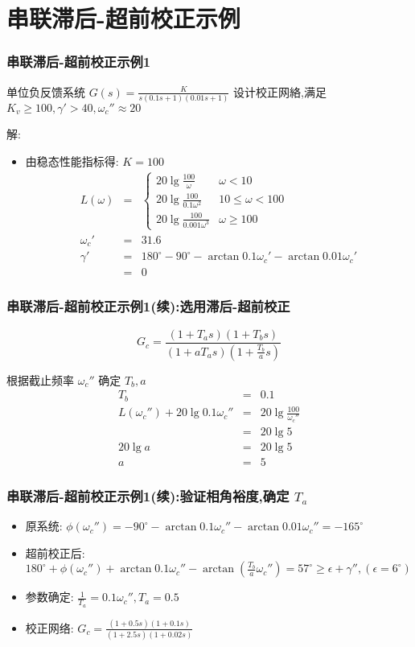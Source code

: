 \documentclass[table]{beamer}
\begin{document}
\section{串联滞后-超前校正示例}
\label{sec-2}
\begin{frame}
\frametitle{串联滞后-超前校正示例1}
\label{sec-2-1}

单位负反馈系统  $G(s)=\frac{K}{s(0.1s+1)(0.01s+1)}$  设计校正网絡,满足  $K_v \geq 100,\gamma'>40,\omega_c''\approx 20$ 

解:
\begin{itemize}
\item <2->由稳态性能指标得:  $K=100$ 
      \begin{eqnarray*}
      L(\omega) & = &\begin{cases}20\lg\frac{100}{\omega} & \omega<10 \\
                                  20\lg\frac{100}{0.1\omega^2} & 10\leq \omega<100 \\
                                  20\lg\frac{100}{0.001\omega^3} & \omega \geq 100 \end{cases} \\
      \omega_c' &=& 31.6 \\
      \gamma' &=& 180^{\circ}-90^{\circ}-\arctan0.1\omega_c'-\arctan0.01\omega_c' \\
       &=& 0 
      \end{eqnarray*}
\end{itemize}
\end{frame}
\begin{frame}
\frametitle{串联滞后-超前校正示例1(续):选用滞后-超前校正}
\label{sec-2-2}


\[G_c = \frac{(1+T_a s)(1+T_b s)}{(1+aT_a s)(1+\frac{T_b}{a}s)}\]

根据截止频率  $\omega_c''$  确定  $T_b,a$ 
\begin{eqnarray*}
T_b & = & 0.1\\
L(\omega_c'') +20\lg0.1\omega_c'' &=& 20\lg\frac{100}{\omega_c''} \\
&=& 20\lg5\\
20\lg a &=& 20\lg5 \\
a &=& 5 
\end{eqnarray*}
\end{frame}
\begin{frame}
\frametitle{串联滞后-超前校正示例1(续):验证相角裕度,确定 $T_{a}$}
\label{sec-2-3}

\begin{itemize}
\item 原系统: $\phi(\omega_c'') = -90^{\circ}-\arctan 0.1\omega_c''-\arctan 0.01\omega_c''=-165^{\circ}$
\item 超前校正后: 
      $180^{\circ}+\phi(\omega_c'')+\arctan0.1\omega_c''-\arctan(\frac{T_b}{a}\omega_c'')= 57^{\circ}\geq\epsilon+\gamma'',(\epsilon=6^{\circ})$
\item 参数确定: $\frac{1}{T_a} =0.1\omega_c'',T_a = 0.5$
\item 校正网络: 
       $G_c=\frac{(1+0.5s)(1+0.1s)}{(1+2.5s)(1+0.02s)}$
\end{itemize}
\end{frame}
\end{document}
